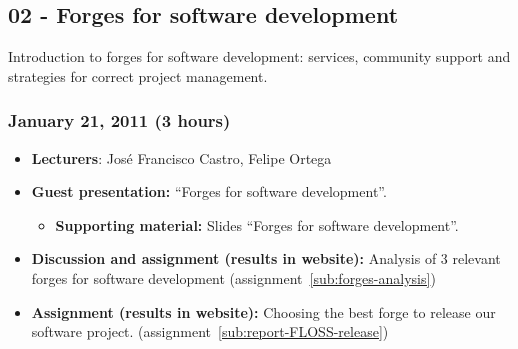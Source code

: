 \documentclass[a4paper]{article}
\begin{document}
\subsection{02 - Forges for software development}

Introduction to forges for software development: services, community support and strategies for correct project management.

\subsubsection{January 21, 2011 (3 hours)}

\begin{itemize}
\item \textbf{Lecturers}: José Francisco Castro, Felipe Ortega
\item \textbf{Guest presentation:} ``Forges for software development''.
  \begin{itemize}
  \item \textbf{Supporting material:} Slides ``Forges for software development''.
  \end{itemize}
\item \textbf{Discussion and assignment (results in website):} Analysis of 3 relevant forges for software development (assignment~\ref{sub:forges-analysis})
\item \textbf{Assignment (results in website):} Choosing the best forge to release our software project. (assignment~\ref{sub:report-FLOSS-release})
\end{itemize}
\end{document}

